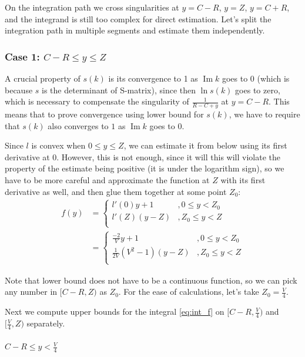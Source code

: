 \documentclass{gCOV2e}
\theoremstyle{plain}%
\theoremstyle{definition}
\theoremstyle{remark}
\begin{document}
On the integration path we cross singularities at $y = C - R$, $y = Z$, $y = C + R$, and the integrand is still too complex for direct estimation. Let's split the integration path in multiple segments and estimate them independently.

\subsubsection{Case 1: $C - R \le y \le Z$}
A crucial property of $s(k)$ is its convergence to 1 as $\operatorname{Im} k$ goes to 0 (which is because $s$ is the determinant of S-matrix), since then $\ln s(k)$ goes to zero, which is necessary to compensate the singularity of $\frac{1}{R - C + y}$ at $y = C - R$. 
This means that to prove convergence using lower bound for $s(k)$, we have to require that $s(k)$ also converges to $1$ as $\operatorname{Im} k$ goes to $0$.

Since $l$ is convex when $0 \le y \le Z$, we can estimate it from below using its first derivative at $0$. However, this is not enough, since it will this will violate the property of the estimate being positive (it is under the logarithm sign), so we have to be more careful and approximate the function at $Z$ with its first derivative as well, and then glue them together at some point $Z_0$:
\begin{align*}
f(y)
& = 
\begin{cases}
l'(0) y + 1   &, 0 \le y < Z_0  \\
l'(Z) (y - Z) &, Z_0 \le y < Z \\
\end{cases}
\\
& =
\begin{cases}
\frac{-2}{V} y + 1   &, 0 \le y < Z_0  \\
\frac{1}{2 V}(V^2 - 1) (y - Z) &, Z_0 \le y < Z \\
\end{cases}
\end{align*}

Note that lower bound does not have to be a continuous function, so we can pick any number in $[C - R, Z)$ as $Z_0$. For the ease of calculations, let's take $Z_0 = \frac{V}{4}$.

Next we compute upper bounds for the integral \ref{eq:int_f} on $[C - R, \frac{V}{4})$ and $[\frac{V}{4}, Z)$ separately.

\paragraph{$C - R \le y < \frac{V}{4}$}
\end{document}
